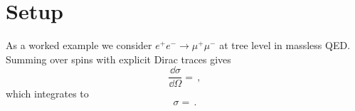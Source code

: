 \section{Setup}
\label{sec:setup}


As a worked example we consider $e^+e^-\to\mu^+\mu^-$ at tree level in massless
QED. Summing over spins with explicit Dirac traces gives
\begin{equation}
  \frac{\dd\sigma}{\dd\Omega} = \,,
  \label{eq:dsigma}
\end{equation}
which integrates to
\begin{equation}
  \sigma = \,.
  \label{eq:sigmatot}
\end{equation}

